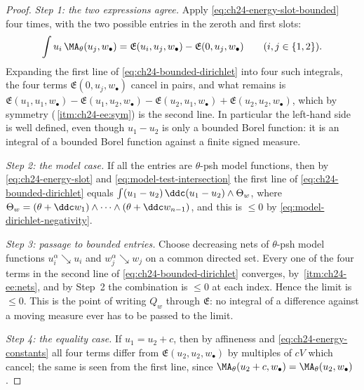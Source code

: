 \begin{proof}
\emph{Step 1: the two expressions agree.}  Apply
\eqref{eq:ch24-energy-slot-bounded} four times, with the two possible
entries in the zeroth and first slots:
\[
 \int u_i\,\MA_\theta(u_j,w_\bullet)
 =\mathfrak E(u_i,u_j,w_\bullet)-\mathfrak E(0,u_j,w_\bullet)
 \qquad (i,j\in\{1,2\}).
\]
Expanding the first line of \eqref{eq:ch24-bounded-dirichlet} into four such
integrals, the four terms \(\mathfrak E(0,u_j,w_\bullet)\) cancel in pairs,
and what remains is
\(\mathfrak E(u_1,u_1,w_\bullet)-\mathfrak E(u_1,u_2,w_\bullet)
 -\mathfrak E(u_2,u_1,w_\bullet)+\mathfrak E(u_2,u_2,w_\bullet)\), which by
symmetry (\,\cref{itm:ch24-ee:sym}) is the
second line.  In particular the left-hand side is well defined, even though
\(u_1-u_2\) is only a bounded Borel function: it is an integral of a bounded
Borel function against a finite signed measure.

\emph{Step 2: the model case.}  If all the entries are \(\theta\)-psh model
functions, then by \eqref{eq:ch24-energy-slot} and
\eqref{eq:model-test-intersection} the first line of
\eqref{eq:ch24-bounded-dirichlet} equals
\(\int(u_1-u_2)\,\ddc(u_1-u_2)\wedge\Theta_w\), where
\(\Theta_w=(\theta+\ddc w_1)\wedge\cdots\wedge(\theta+\ddc w_{n-1})\), and
this is \(\leq0\) by \eqref{eq:model-dirichlet-negativity}.

\emph{Step 3: passage to bounded entries.}  Choose decreasing nets of
\(\theta\)-psh model functions \(u_i^\alpha\searrow u_i\) and
\(w_j^\alpha\searrow w_j\) on a common directed set.  Every one of the four
terms in the second line of \eqref{eq:ch24-bounded-dirichlet} converges, by
\,\cref{itm:ch24-ee:nets}, and by Step~2 the
combination is \(\leq0\) at each index.  Hence the limit is \(\leq0\).  This
is the point of writing \(Q_w\) through \(\mathfrak E\): no integral of a
difference against a moving measure ever has to be passed to the limit.

\emph{Step 4: the equality case.}  If \(u_1=u_2+c\), then by affineness and
\eqref{eq:ch24-energy-constants} all four terms differ from
\(\mathfrak E(u_2,u_2,w_\bullet)\) by multiples of \(cV\) which cancel; the
same is seen from the first line, since \(\MA_\theta(u_2+c,w_\bullet)
=\MA_\theta(u_2,w_\bullet)\).
\end{proof}

